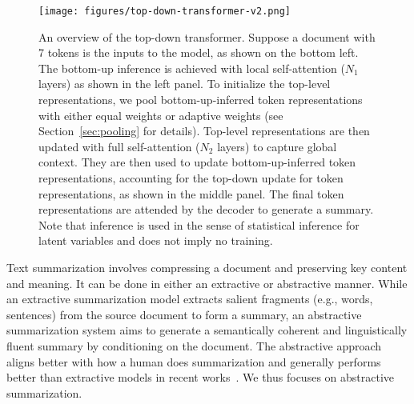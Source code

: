 \begin{figure}
    \centering
    \texttt{[image: figures/top-down-transformer-v2.png]}
    \caption{\footnotesize An overview of the top-down transformer. Suppose a document with 7 tokens is the inputs to the model, as shown on the bottom left. The bottom-up inference is achieved with local self-attention ($N_1$ layers) as shown in the left panel. To initialize the top-level representations, we pool bottom-up-inferred token representations with either equal weights or adaptive weights (see Section~\ref{sec:pooling} for details). Top-level representations are then updated with full self-attention ($N_2$ layers) to capture global context. They are then used to update bottom-up-inferred token representations, accounting for the top-down update for token representations, as shown in the middle panel. The final token representations are attended by the decoder to generate a summary. Note that inference is used in the sense of statistical inference for latent variables and does not imply no training. }
    \label{fig:top-down-transformer}
\end{figure}

Text summarization involves compressing a document and preserving key content and meaning. It can be done in either an extractive or abstractive manner. While an extractive summarization model extracts salient fragments (e.g., words, sentences) from the source document to form a summary, an abstractive summarization system aims to generate a semantically coherent and linguistically fluent summary by conditioning on the document. The abstractive approach aligns better with how a human does summarization and generally performs better than extractive models in recent works~\citep{pilault-etal-2020-extractive, zhang2020pegasus}. We thus focuses on abstractive summarization.

